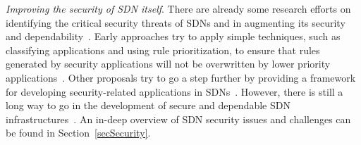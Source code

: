 %


\noindent \textit{Improving the security of SDN itself}.
There are already some research efforts on identifying the critical security threats of SDNs and in augmenting its security and dependability~\cite{porras2012,shin2013-1,kreutz2013}.
Early approaches try to apply simple techniques, such as classifying applications and using rule prioritization, to ensure that rules generated by security applications will not be overwritten by 
lower priority applications~\cite{porras2012}. 
Other proposals try to go a step further by providing a framework for developing security-related applications in SDNs~\cite{shin2013-1}.
However, there is still a long way to go in the development of secure and dependable SDN infrastructures~\cite{kreutz2013}.
An in-deep overview of SDN security issues and challenges can be found in Section~\ref{secSecurity}.

